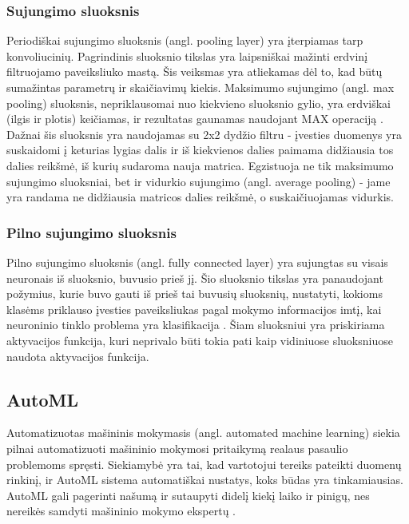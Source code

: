 \documentclass{VUMIFPSbakalaurinis}
\begin{document}
\subsubsection{Sujungimo sluoksnis}
Periodiškai sujungimo sluoksnis (angl. pooling layer) yra įterpiamas tarp konvoliucinių. Pagrindinis sluoksnio tikslas yra laipsniškai mažinti erdvinį filtruojamo paveiksliuko mastą.
Šis veiksmas yra atliekamas dėl to, kad būtų sumažintas parametrų ir skaičiavimų kiekis. Maksimumo sujungimo (angl. max pooling) sluoksnis, nepriklausomai nuo kiekvieno
sluoksnio gylio, yra erdviškai (ilgis ir plotis) keičiamas, ir rezultatas gaunamas naudojant MAX operaciją \cite{7927440}. Dažnai šis sluoksnis yra naudojamas su 2x2 dydžio filtru - įvesties 
duomenys yra suskaidomi į keturias lygias dalis ir iš kiekvienos dalies paimama didžiausia tos dalies reikšmė, iš kurių sudaroma nauja matrica. Egzistuoja ne tik 
maksimumo sujungimo sluoksniai, bet ir vidurkio sujungimo (angl. average pooling) - jame yra randama ne didžiausia matricos dalies reikšmė, o suskaičiuojamas vidurkis.

\subsubsection{Pilno sujungimo sluoksnis}
Pilno sujungimo sluoksnis (angl. fully connected layer) yra sujungtas su visais 
neuronais iš sluoksnio, buvusio prieš jį. Šio sluoksnio tikslas yra panaudojant požymius, kurie buvo gauti iš prieš tai buvusių sluoksnių, nustatyti, kokioms 
klasėms priklauso įvesties paveiksliukas pagal mokymo informacijos imtį, kai neuroninio tinklo problema yra klasifikacija \cite{Sinha2018InterweavingC}. Šiam 
sluoksniui yra priskiriama aktyvacijos funkcija, kuri neprivalo būti tokia pati kaip vidiniuose sluoksniuose naudota aktyvacijos funkcija. 

\subsection{AutoML}

Automatizuotas mašininis mokymasis (angl. automated machine learning) siekia pilnai automatizuoti mašininio mokymosi pritaikymą realaus pasaulio problemoms spręsti. Siekiamybė yra tai, kad vartotojui tereiks pateikti duomenų rinkinį, ir AutoML sistema automatiškai nustatys, koks būdas yra tinkamiausias. AutoML gali pagerinti našumą ir sutaupyti didelį kiekį laiko ir pinigų, nes nereikės samdyti mašininio mokymo ekspertų \cite{14f00e7a0861477a81f65b5c51f660f4}.
\end{document}
